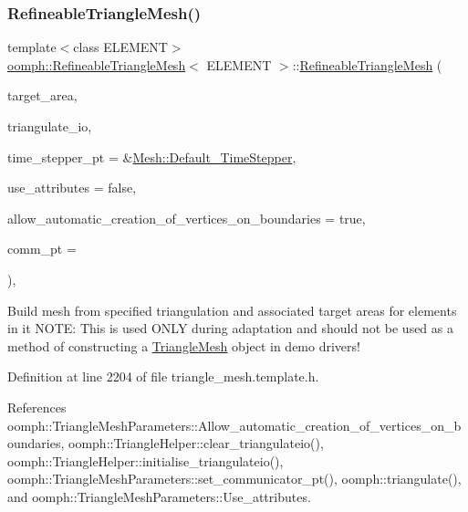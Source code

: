 \subsubsection{\texorpdfstring{Refineable\+Triangle\+Mesh()}{RefineableTriangleMesh()}\hspace{0.1cm}{\footnotesize\ttfamily [3/3]}}
{\footnotesize\ttfamily template$<$class E\+L\+E\+M\+E\+NT$>$ \\
\hyperlink{classoomph_1_1RefineableTriangleMesh}{oomph\+::\+Refineable\+Triangle\+Mesh}$<$ E\+L\+E\+M\+E\+NT $>$\+::\hyperlink{classoomph_1_1RefineableTriangleMesh}{Refineable\+Triangle\+Mesh} (\begin{DoxyParamCaption}\item[{const \hyperlink{classoomph_1_1Vector}{Vector}$<$ double $>$ \&}]{target\+\_\+area,  }\item[{\hyperlink{structoomph_1_1TriangulateIO}{Triangulate\+IO} \&}]{triangulate\+\_\+io,  }\item[{\hyperlink{classoomph_1_1TimeStepper}{Time\+Stepper} $\ast$}]{time\+\_\+stepper\+\_\+pt = {\ttfamily \&\hyperlink{classoomph_1_1Mesh_a12243d0fee2b1fcee729ee5a4777ea10}{Mesh\+::\+Default\+\_\+\+Time\+Stepper}},  }\item[{const bool \&}]{use\+\_\+attributes = {\ttfamily false},  }\item[{const bool \&}]{allow\+\_\+automatic\+\_\+creation\+\_\+of\+\_\+vertices\+\_\+on\+\_\+boundaries = {\ttfamily true},  }\item[{\hyperlink{classoomph_1_1OomphCommunicator}{Oomph\+Communicator} $\ast$}]{comm\+\_\+pt = {} }\end{DoxyParamCaption})\hspace{0.3cm}{\ttfamily [inline]}, {\ttfamily [protected]}}



Build mesh from specified triangulation and associated target areas for elements in it N\+O\+TE\+: This is used O\+N\+LY during adaptation and should not be used as a method of constructing a \hyperlink{classoomph_1_1TriangleMesh}{Triangle\+Mesh} object in demo drivers! 



Definition at line 2204 of file triangle\+\_\+mesh.\+template.\+h.



References oomph\+::\+Triangle\+Mesh\+Parameters\+::\+Allow\+\_\+automatic\+\_\+creation\+\_\+of\+\_\+vertices\+\_\+on\+\_\+boundaries, oomph\+::\+Triangle\+Helper\+::clear\+\_\+triangulateio(), oomph\+::\+Triangle\+Helper\+::initialise\+\_\+triangulateio(), oomph\+::\+Triangle\+Mesh\+Parameters\+::set\+\_\+communicator\+\_\+pt(), oomph\+::triangulate(), and oomph\+::\+Triangle\+Mesh\+Parameters\+::\+Use\+\_\+attributes.

